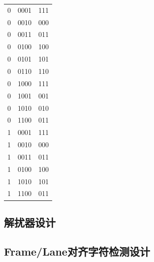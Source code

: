 \documentclass[UTF8]{ctexart}
\begin{document}
\begin{table}[H]
\begin{minipage}[t]{.5\textwidth}
\begin{tabular}{|c|c|c|}
\hline
	0	&	0001	&	111	\\
	0	&	0010	&	000	\\
	0	&	0011	&	011	\\
	0	&	0100	&	100	\\
	0	&	0101	&	101	\\
	0	&	0110	&	110	\\
	0	&	1000	&	111	\\
	0	&	1001	&	001	\\
	0	&	1010	&	010	\\
	0	&	1100	&	011	\\
	1	&	0001	&	111	\\
	1	&	0010	&	000	\\
	1	&	0011	&	011	\\
	1	&	0100	&	100	\\
	1	&	1010	&	101	\\
	1	&	1100	&	011	\\
\hline
\end{tabular}
\end{minipage}
\end{table}

\subsection{解扰器设计}

\subsection{Frame/Lane对齐字符检测设计}


\end{document}
